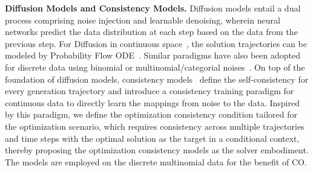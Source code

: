 
\textbf{Diffusion Models and Consistency Models.} Diffusion models entail a dual process comprising noise injection and learnable denoising, wherein neural networks predict the data distribution at each step based on the data from the previous step. For Diffusion in continuous space~\cite{sohl2015deep,song2019generative,ho2020denoising,song2020denoising,song2020improved,nichol2021improved,dhariwal2021diffusion}, the solution trajectories can be modeled by Probability Flow ODE~\cite{song2020score}. Similar paradigms have also been adopted for discrete data using binomial or multinomial/categorial noises~\cite{sohl2015deep,austin2021structured,hoogeboom2021argmax}. On top of the foundation of diffusion models, consistency models~\cite{song2023consistency} define the self-consistency for every generation trajectory and introduce a consistency training paradigm for continuous data to directly learn the mappings from noise to the data. Inspired by this paradigm, we define the optimization consistency condition tailored for the optimization scenario, which requires consistency across multiple trajectories and time steps with the optimal solution as the target in a conditional context, thereby proposing the optimization consistency models as the solver embodiment. The models are employed on the discrete multinomial data for the benefit of CO.



%